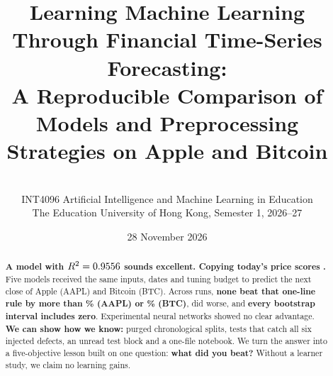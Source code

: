 \documentclass[11pt,a4paper]{article}
\title{\vspace{-1.2cm}\bfseries Learning Machine Learning Through Financial
Time-Series Forecasting:\\[2pt]
\large A Reproducible Comparison of Models and Preprocessing Strategies on
Apple and Bitcoin}
\author{\GroupAuthors\\[2pt]
\small INT4096 Artificial Intelligence and Machine Learning in Education\\
\small The Education University of Hong Kong, Semester 1, 2026--27}
\date{28 November 2026}
\begin{document}
\maketitle
\vspace{-0.6cm}

\begin{abstract}
\noindent
\textbf{A model with $R^2=0.9556$ sounds excellent. Copying today's price
scores \HookAAPLPersistenceRsq.} Five models received the same inputs, dates and tuning budget to
predict the next close of Apple (AAPL) and Bitcoin (BTC). Across \NRunTotal{} runs,
\textbf{none beat that one-line rule by more than \BestAAPLSkill\% (AAPL) or
\BestBTCAllSkill\% (BTC)}, \NBelowAll{} did worse, and \textbf{every bootstrap
interval includes zero}. Experimental neural networks showed no clear advantage.
\textbf{We can show how we know:} purged chronological splits, tests that catch all
six injected defects, an unread test block and a one-file notebook. We turn the
answer into a five-objective lesson built on one question: \textbf{what did you
beat?} Without a learner study, we claim no learning gains.
\end{abstract}

\vspace{0.2cm}















\end{document}
